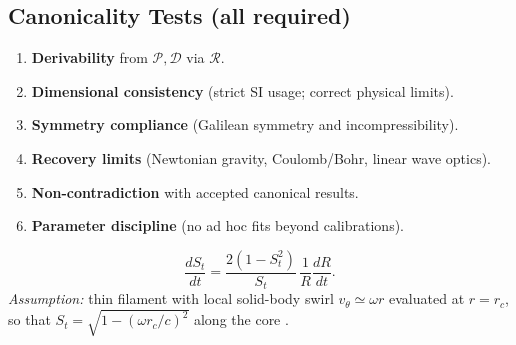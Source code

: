 \documentclass[10pt,reprint,aps,onecolumn,nofootinbib]{revtex4-2}
\begin{document}
    \subsection*{Canonicality Tests (all required)}
    \begin{enumerate}
    \item \textbf{Derivability} from $\mathcal{P},\mathcal{D}$ via $\mathcal{R}$.
    \item \textbf{Dimensional consistency} (strict SI usage; correct physical limits).
    \item \textbf{Symmetry compliance} (Galilean symmetry and incompressibility).
    \item \textbf{Recovery limits} (Newtonian gravity, Coulomb/Bohr, linear wave optics).
    \item \textbf{Non-contradiction} with accepted canonical results.
    \item \textbf{Parameter discipline} (no ad hoc fits beyond calibrations).
    \end{enumerate}
    \begin{tcolorbox}[title=Corollary: Clock--Radius Transport]
    \[
        \frac{dS_t}{dt}=\frac{2(1-S_t^2)}{S_t}\,\frac{1}{R}\frac{dR}{dt}.
    \]
    \textit{Assumption:} thin filament with local solid-body swirl $v_\theta\simeq \omega r$ evaluated at $r=r_c$, so that
    $S_t=\sqrt{1-(\omega r_c/c)^2}$ along the core \cite{Batchelor1967,Saffman1992}. %
    \end{tcolorbox}
\end{document}
